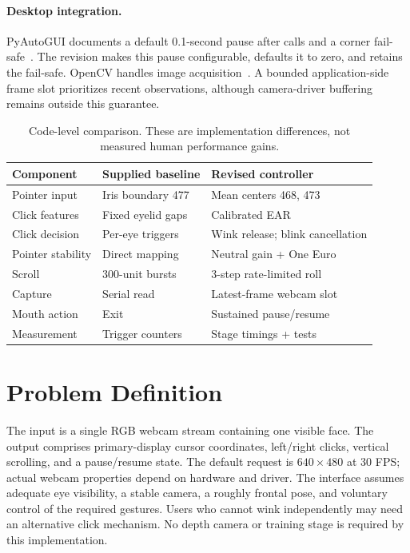 \documentclass[10pt,twocolumn,letterpaper]{article}
\begin{document}
\paragraph{Desktop integration.} PyAutoGUI documents a default 0.1-second pause after calls and a corner fail-safe~\cite{pyauto}. The revision makes this pause configurable, defaults it to zero, and retains the fail-safe. OpenCV handles image acquisition~\cite{opencv}. A bounded application-side frame slot prioritizes recent observations, although camera-driver buffering remains outside this guarantee.

\begin{table}[t]
\centering\small
\begin{tabularx}{\columnwidth}{@{}p{}XX@{}}
\toprule Component & Supplied baseline & Revised controller\\\midrule
Pointer input & Iris boundary 477 & Mean centers 468, 473\\
Click features & Fixed eyelid gaps & Calibrated EAR\\
Click decision & Per-eye triggers & Wink release; blink cancellation\\
Pointer stability & Direct mapping & Neutral gain + One Euro\\
Scroll & 300-unit bursts & 3-step rate-limited roll\\
Capture & Serial read & Latest-frame webcam slot\\
Mouth action & Exit & Sustained pause/resume\\
Measurement & Trigger counters & Stage timings + tests\\\bottomrule
\end{tabularx}
\caption{Code-level comparison. These are implementation differences, not measured human performance gains.}
\label{tab:comparison}
\end{table}

\section{Problem Definition}
The input is a single RGB webcam stream containing one visible face. The output comprises primary-display cursor coordinates, left/right clicks, vertical scrolling, and a pause/resume state. The default request is $640\times480$ at 30 FPS; actual webcam properties depend on hardware and driver. The interface assumes adequate eye visibility, a stable camera, a roughly frontal pose, and voluntary control of the required gestures. Users who cannot wink independently may need an alternative click mechanism. No depth camera or training stage is required by this implementation.
\end{document}
